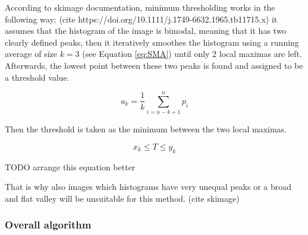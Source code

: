 According to skimage documentation, minimum thresholding works in the following way: (cite  https://doi.org/10.1111/j.1749-6632.1965.tb11715.x) it assumes that the histogram of the image is bimodal, meaning that it has two clearly defined peaks, then it iteratively smoothes the histogram using a running average of size $k=3$ (see Equation \ref{eq:SMA}) until only 2 local maximas are left. Afterwards, the lowest point between these two peaks is found and assigned to be a threshold value.

\begin{equation}
    a_k = \frac{1}{k}\sum_{i=n-k + 1}^{n}p_i
\label{eq:SMA}
\end{equation}

Then the threshold is taken as the minimum between the two local maximas.

\begin{equation}
    x_k \leq T \leq y_k
\end{equation}

TODO arrange this equation better

That is why also images which histograms have very unequal peaks or a broad and flat valley will be unsuitable for this method. (cite skimage)

\subsubsection{Overall algorithm}

